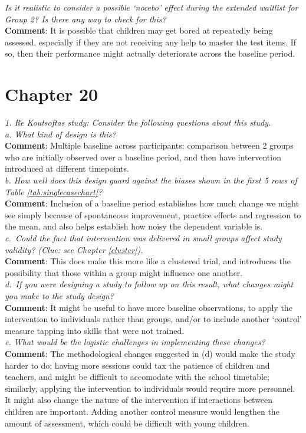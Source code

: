 \documentclass{krantz}
\begin{document}
\emph{Is it realistic to consider a possible `nocebo' effect during the extended waitlist for Group 2? Is there any way to check for this?}\\
\textbf{Comment}: It is possible that children may get bored at repeatedly being assessed, especially if they are not receiving any help to master the test items. If so, then their performance might actually deteriorate across the baseline period.

\hypertarget{chapter-20}{%
\section{Chapter 20}\label{chapter-20}}

\emph{1. Re Koutsoftas study: Consider the following questions about this study.}\\
\emph{a. What kind of design is this?}\\
\textbf{Comment}: Multiple baseline across participants: comparison between 2 groups who are initially observed over a baseline period, and then have intervention introduced at different timepoints.\\
\emph{b. How well does this design guard against the biases shown in the first 5 rows of Table \ref{tab:singlecasechart}?}\\
\textbf{Comment}: Inclusion of a baseline period establishes how much change we might see simply because of spontaneous improvement, practice effects and regression to the mean, and also helps establish how noisy the dependent variable is.\\
\emph{c.~Could the fact that intervention was delivered in small groups affect study validity? (Clue: see Chapter \ref{cluster}).}\\
\textbf{Comment}: This does make this more like a clustered trial, and introduces the possibility that those within a group might influence one another.\\
\emph{d.~If you were designing a study to follow up on this result, what changes might you make to the study design?}\\
\textbf{Comment}: It might be useful to have more baseline observations, to apply the intervention to individuals rather than groups, and/or to include another `control' measure tapping into skills that were not trained.\\
\emph{e. What would be the logistic challenges in implementing these changes?}\\
\textbf{Comment}: The methodological changes suggested in (d) would make the study harder to do; having more sessions could tax the patience of children and teachers, and might be difficult to accomodate with the school timetable; similarly, applying the intervention to individuals would require more personnel. It might also change the nature of the intervention if interactions between children are important. Adding another control measure would lengthen the amount of assessment, which could be difficult with young children.
\end{document}
